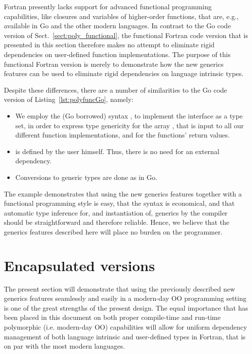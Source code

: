 \documentclass[11pt,oneside]{report}
\newcommand{\code}[1]{{\selectfont\ttfamily{#1}}}
\begin{document}
Fortran presently lacks support for advanced functional programming
capabilities, like closures and variables of higher-order functions,
that are, e.g., available in Go and the other modern languages. In
contrast to the Go code version of Sect.~\ref{sect:poly_functional},
the functional Fortran code version that is presented in this section
therefore makes no attempt to eliminate rigid dependencies on
user-defined function implementations. The purpose of this functional
Fortran version is merely to demonstrate how the new generics features
can be used to eliminate rigid dependencies on language intrinsic
types.

Despite these differences, there are a number of similarities
to the Go code version of Listing~\ref{lst:polyfuncGo}, namely:
\begin{itemize}
\item
  We employ the (Go borrowed) syntax \code{integer | real(real64)}, to
  implement the interface \code{INumeric} as a type set, in order to
  express type genericity for the array \code{x}, that is input to all
  our different function implementations, and for the functions'
  return values.
\item
  \code{INumeric} is defined by the user himself. Thus, there is no
  need for an external dependency.
\item
  Conversions to generic types are done as in Go.
\end{itemize}



The example demonstrates that using the new generics features together
with a functional programming style is easy, that the syntax is
economical, and that automatic type inference for, and instantiation of,
generics by the compiler should be straightforward and therefore
reliable. Hence, we believe that the generics features described here
will place no burden on the programmer.


\section{Encapsulated versions}

The present section will demonstrate that using the previously
described new generics features seamlessly and easily in a modern-day
OO programming setting is one of the great strengths of the present
design. The equal importance that has been placed in this document on
both proper compile-time and run-time polymorphic (i.e. modern-day OO)
capabilities will allow for uniform dependency management of both
language intrinsic and user-defined types in Fortran, that is on par
with the most modern languages.
\end{document}
